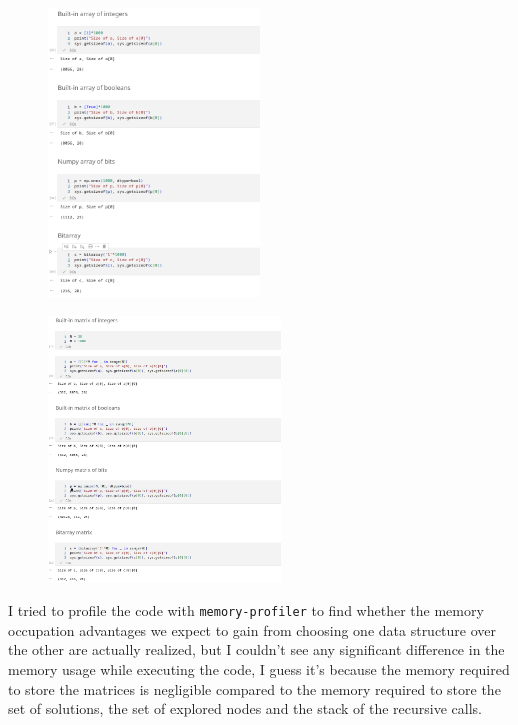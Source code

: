 \documentclass{beamer}
\begin{document}
\begin{frame}
        \begin{figure}
            \centering
            \includegraphics[width=0.5\textwidth]{mem_array.png}
            \label{fig:mem_array}
        \end{figure}
\end{frame}

\begin{frame}
        \begin{figure}
            \centering
            \includegraphics[width=0.55\textwidth]{mem_matrix.png}
            \label{fig:mem_matrix}
        \end{figure}
\end{frame}

\begin{frame}
    I tried to profile the code with \texttt{memory-profiler} 
    to find whether the memory occupation
    advantages
    we expect to gain from choosing one data structure over the other
    are actually realized, but I couldn't see any significant difference
    in the memory usage while executing the code, I guess it's because
    the memory required to store the matrices is negligible compared
    to the memory required to store the set of solutions, the set of explored nodes
    and the stack of the recursive calls.
\end{frame}
\end{document}
